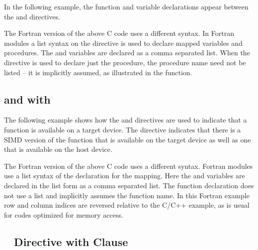 In the following example, the function and variable declarations appear between 
the   and    
directives.


The Fortran version of the above C code uses a different syntax. In Fortran modules 
a list syntax on the   directive is used to declare 
mapped variables and procedures. The  and  variables are declared as a comma 
separated list. When the   directive is used to 
declare just the procedure, the procedure name need not be listed -- it is implicitly 
assumed, as illustrated in the  function.


\subsection{  and    with  }
\label{subsec:declare_target_simd}

The following example shows how the   and  
  directives are used to indicate that a function 
is available on a target device. The   directive indicates 
that there is a SIMD version of the function  that is available on the target 
device as well as one that is available on the host device.


The Fortran version of the above C code uses a different syntax. Fortran modules 
use a list syntax of the   declaration for the mapping. 
Here the  and  variables are declared in the list form as a comma separated list. 
The function declaration does not use a list and implicitly assumes the function 
name. In this Fortran example row and column indices are reversed relative to the 
C/C++ example, as is usual for codes optimized for memory access.



\subsection{~ Directive with  Clause}
\label{subsec:declare_target_link}

